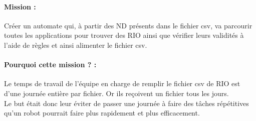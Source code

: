 \documentclass[a4paper,twoside,12pt]{report}
\begin{document}
\paragraph {Mission :}
Créer un automate qui, à partir des ND présents dans le fichier csv, va parcourir toutes les applications pour trouver des RIO ainsi que vérifier leurs validités à l'aide de règles et ainsi alimenter le fichier csv.\\
\paragraph {Pourquoi cette mission ? :} 
Le temps de travail de l'équipe en charge de remplir le fichier csv de RIO est d'une journée entière par fichier. Or ils reçoivent un fichier tous les jours.\\
Le but était donc leur éviter de passer une journée à faire des tâches répétitives qu'un robot pourrait faire plus rapidement et plus efficacement.
\end{document}
